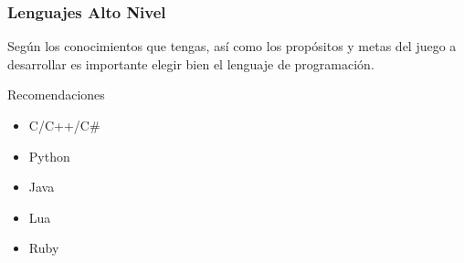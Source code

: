 
\begin{frame}
	\frametitle{Lenguajes Alto Nivel}
	
	Según los conocimientos que tengas, así como los propósitos y metas del juego a desarrollar es importante elegir bien el lenguaje de programación.
		
	\begin{block}{Recomendaciones}
		\begin{itemize}
			\item C/C++/C\#
			\item Python
			\item Java
			\item Lua
			\item Ruby
		\end{itemize}
	\end{block}

\end{frame}


